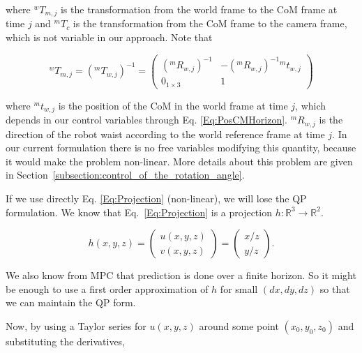 \noindent where $^wT_{m,j}$ is the transformation from the world frame to the CoM frame at time $j$ and $^mT_c$ is the transformation from the CoM frame to the camera frame, which is not variable in our approach. Note that

$$
^wT_{m,j} = (^mT_{w,j})^{-1} = 
\left(
\begin{matrix}
(^mR_{w,j})^{-1} & -(^mR_{w,j})^{-1} {^mt_{w,j}}\\
0_{1 \times 3} & 1
\end{matrix}
\right)
$$ 

\noindent where $^mt_{w,j}$ is the position of the CoM in the world frame at time $j$, which depends in our control variables through Eq. \ref{Eq:PosCMHorizon}.
$^mR_{w,j}$ is the direction of the robot waist according to the world reference frame at time $j$. In our current formulation 
there is no free variables modifying this quantity, because it would make the problem non-linear. More details
about this problem are given in Section~\ref{subsection:control_of_the_rotation_angle}.

If we use directly Eq. \ref{Eq:Projection} (non-linear), we will lose the QP formulation. 
We know that Eq.~\ref{Eq:Projection} is a projection $h:\mathbb{R}^3 \rightarrow \mathbb{R}^2$.

\begin{equation*}
h(x,y,z) =
 \left(
 \begin{matrix}
  u(x,y,z) \\
  v(x,y,z)
 \end{matrix}
 \right)
 = \left(
 \begin{matrix}
  x / z\\
  y / z
 \end{matrix}
 \right).
\end{equation*}


We also know from MPC that prediction is done over a finite horizon. So it might be enough to use a first order approximation of $h$ for small $(dx,dy,dz)$ so that we can maintain the QP form.

Now, by using a Taylor series for $u(x,y,z)$ around some point $(x_0,y_0,z_0)$ and substituting the derivatives,


